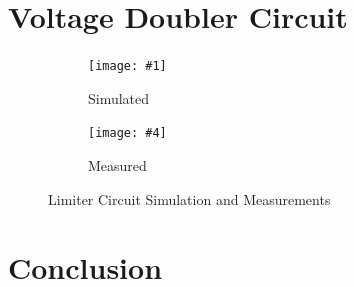 \documentclass{../../ece-report}
\newcommand{\twosubfigures}[6]{
  \begin{subfigure}{0.45\textwidth}
    \texttt{[image: \#1]}
    \caption{#2}
    \label{#3}
  \end{subfigure}
  \begin{subfigure}{0.45\textwidth}
    \texttt{[image: \#4]}
    \caption{#5}
    \label{#6}
  \end{subfigure}
}
\begin{document}
\section{Voltage Doubler Circuit}

\begin{figure}[h!]
  \centering
  \twosubfigures{../plots/circuit_d/pdf/d_sim_trans.pdf }{Simulated}{fig:d_simulated}
                {../plots/circuit_d/pdf/d_meas_trans.pdf}{Measured}{fig:d_measured}
  \caption{Limiter Circuit Simulation and Measurements}
  \label{fig:doubler_results}
\end{figure}

\section{Conclusion}
\end{document}
